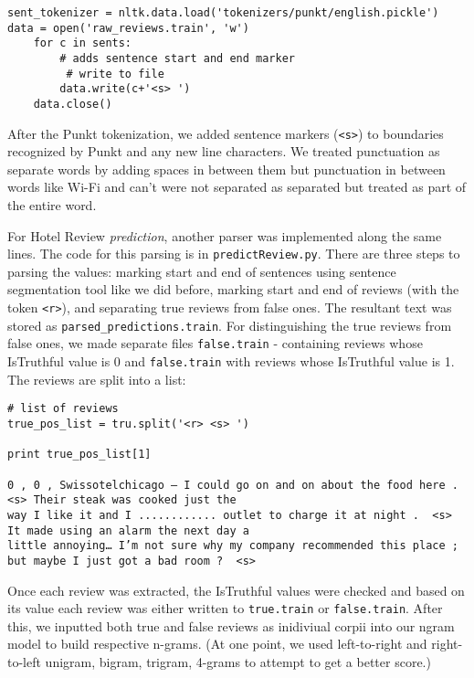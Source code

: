 \documentclass{article}
\begin{document}
{\small
\begin{verbatim}
sent_tokenizer = nltk.data.load('tokenizers/punkt/english.pickle')
data = open('raw_reviews.train', 'w')
    for c in sents:
        # adds sentence start and end marker
         # write to file
        data.write(c+'<s> ')
    data.close()
\end{verbatim}
}

After the Punkt tokenization, we added sentence markers (\texttt{<s>}) to boundaries recognized by Punkt and any new line characters. We treated punctuation as separate words by adding spaces in between them but punctuation in between words like Wi-Fi and can't were not separated as separated but treated as part of the entire word.

For Hotel Review \emph{prediction}, another parser was implemented along the same lines. The code for this parsing is in \texttt{predictReview.py}. There are three steps to parsing the values: marking start and end of sentences using sentence segmentation tool like we did before, marking start and end of reviews (with the token \texttt{<r>}), and separating true reviews from false ones. The resultant text was stored as \texttt{parsed\_predictions.train}. For distinguishing the true reviews from false ones, we made separate files \texttt{false.train} - containing reviews whose IsTruthful value is 0 and \texttt{false.train} with reviews whose IsTruthful value is 1. The reviews are split into a list:\par

{\small\begin{verbatim}
# list of reviews
true_pos_list = tru.split('<r> <s> ')

print true_pos_list[1]

0 , 0 , Swissotelchicago – I could go on and on about the food here .  <s> Their steak was cooked just the 
way I like it and I ............ outlet to charge it at night .  <s> It made using an alarm the next day a
little annoying… I’m not sure why my company recommended this place ;  but maybe I just got a bad room ?  <s>
\end{verbatim}
}
Once each review was extracted, the IsTruthful values were checked and based on its value each review was either written to \texttt{true.train} or \texttt{false.train}. After this, we inputted both true and false reviews as inidiviual corpii into our ngram model to build respective n-grams. (At one point, we used left-to-right and right-to-left unigram, bigram, trigram, 4-grams to attempt to get a better score.)
\end{document}
